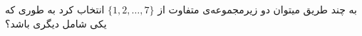 به چند طریق میتوان دو زیرمجموعه‌ی متفاوت از $\{1, 2, \dots, 7\}$ انتخاب کرد به طوری که یکی شامل دیگری باشد؟